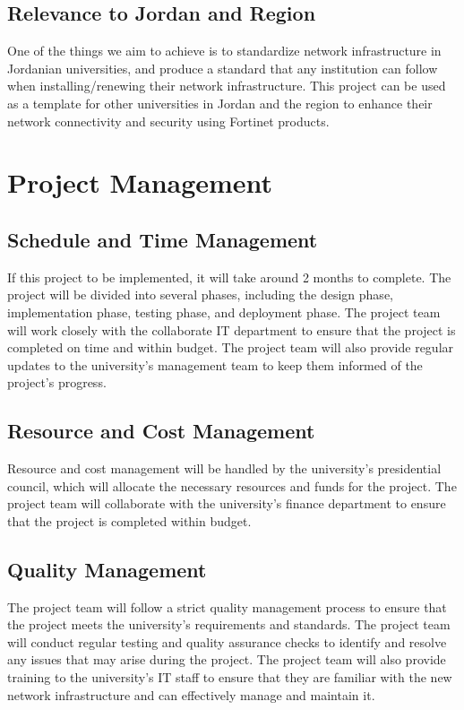 \documentclass[12pt]{report}
\begin{document}
\section{Relevance to Jordan and Region}
One of the things we aim to achieve is to standardize network infrastructure in Jordanian universities, and produce a standard that any institution can follow when installing/renewing their network infrastructure. This project can be used as a template for other universities in Jordan and the region to enhance their network connectivity and security using Fortinet products.

\chapter{Project Management}

\section{Schedule and Time Management}
If this project to be implemented, it will take around 2 months to complete. The project will be divided into several phases, including the design phase, implementation phase, testing phase, and deployment phase. The project team will work closely with the collaborate IT department to ensure that the project is completed on time and within budget. The project team will also provide regular updates to the university's management team to keep them informed of the project's progress.
\section{Resource and Cost Management}
Resource and cost management will be handled by the university's presidential council, which will allocate the necessary resources and funds for the project. The project team will collaborate with the university's finance department to ensure that the project is completed within budget.
\section{Quality Management}
The project team will follow a strict quality management process to ensure that the project meets the university's requirements and standards. The project team will conduct regular testing and quality assurance checks to identify and resolve any issues that may arise during the project. The project team will also provide training to the university's IT staff to ensure that they are familiar with the new network infrastructure and can effectively manage and maintain it.
\end{document}
